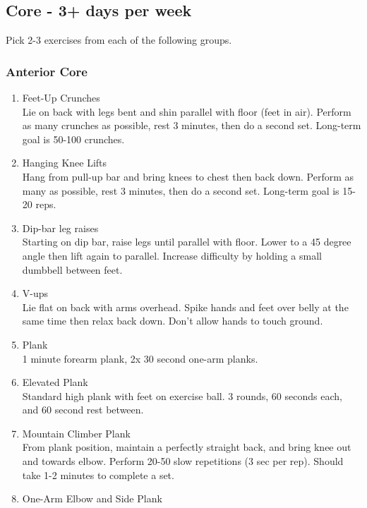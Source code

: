 \documentclass[12pt, letterpaper]{article}
\begin{document}
\subsection{Core - 3+ days per week}

Pick 2-3 exercises from each of the following groups.

\subsubsection{Anterior Core}

\begin{enumerate}
    \item Feet-Up Crunches \\ 
          Lie on back with legs bent and shin parallel with floor (feet in air). Perform as many crunches as possible, 
          rest 3 minutes, then do a second set. Long-term goal is 50-100 crunches.
    \item Hanging Knee Lifts \\ 
          Hang from pull-up bar and bring knees to chest then back down. Perform as many as possible, rest 3 minutes, 
          then do a second set. Long-term goal is 15-20 reps.
    \item Dip-bar leg raises \\
          Starting on dip bar, raise legs until parallel with floor. Lower to a 45 degree angle then lift again to 
          parallel. Increase difficulty by holding a small dumbbell between feet. 
    \item V-ups\\
         Lie flat on back with arms overhead. Spike hands and feet over belly at the same time then relax back down.
         Don't allow hands to touch ground.
    \item Plank \\
          1 minute forearm plank, 2x 30 second one-arm planks.
    \item Elevated Plank \\
          Standard high plank with feet on exercise ball. 3 rounds, 60 seconds each, and 60 second rest between.
    \item Mountain Climber Plank \\ 
          From plank position, maintain a perfectly straight back, and bring knee out and towards elbow. 
          Perform 20-50 slow repetitions (3 sec per rep). 
          Should take 1-2 minutes to complete a set.
    \item One-Arm Elbow and Side Plank \\ 

\end{enumerate}
\end{document}
